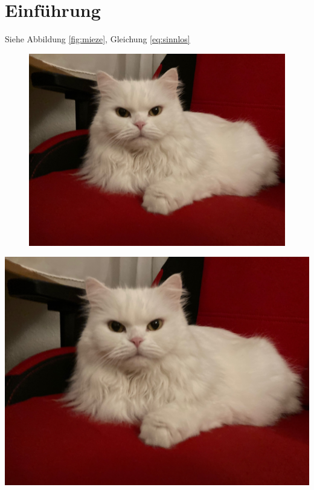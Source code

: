 \documentclass[ngerman,12pt]{scrreprt}
\begin{document}
\tableofcontents

\chapter{Einführung}

\blindtext[2] 

Siehe Abbildung \ref{fig:mieze}, Gleichung \ref{eq:sinnlos}

\begin{figure}
\includegraphics[width=\textwidth]{Bilder/Katze2}
\end{figure}

\blindtext[20]


\includegraphics[width=\textwidth]{Bilder/Katze2}
\label{fig:mieze}
\end{document}
